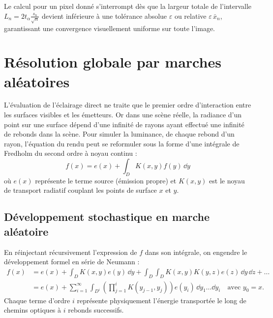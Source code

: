 Le calcul pour un pixel donné s'interrompt dès que la largeur totale de l'intervalle $L_n = 2 t_\alpha \frac{s_n}{\sqrt{n}}$ devient inférieure à une tolérance absolue $\varepsilon$ ou relative $\varepsilon \, \bar{x}_n$, garantissant une convergence visuellement uniforme sur toute l'image.


\section{Résolution globale par marches aléatoires}

L'évaluation de l'éclairage direct ne traite que le premier ordre d'interaction entre les surfaces visibles et les émetteurs. Or dans une scène réelle, la radiance d'un point sur une surface dépend d'une infinité de rayons ayant effectué une infinité de rebonds dans la scène. Pour simuler la luminance, de chaque rebond d'un rayon, l'équation du rendu peut se reformuler sous la forme d'une intégrale de Fredholm du second ordre à noyau continu :
\begin{equation}
    f(x) = e(x) + \int_D K(x, y) f(y) \, \dd y
\end{equation}
où $e(x)$ représente le terme source (émission propre) et $K(x, y)$ est le noyau de transport radiatif couplant les points de surface $x$ et $y$.

\subsection{Développement stochastique en marche aléatoire}

En réinjectant récursivement l'expression de $f$ dans son intégrale, on engendre le développement formel en série de Neumann :
\begin{align}
    f(x) &= e(x) + \int_D K(x, y) e(y) \, \dd y + \int_D \int_D K(x, y) K(y, z) e(z) \, \dd y \, \dd z + \dots \nonumber \\
         &= e(x) + \sum_{i=1}^\infty \int_{D^i} \left( \prod_{j=1}^i K(y_{j-1}, y_j) \right) e(y_i) \, \dd y_1 \dots \dd y_i \quad \text{avec } y_0 = x.
\end{align}
Chaque terme d'ordre $i$ représente physiquement l'énergie transportée le long de chemins optiques à $i$ rebonds successifs.

